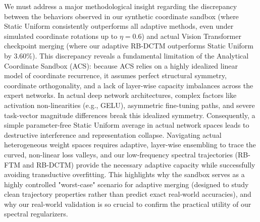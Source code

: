 We must address a major methodological insight regarding the discrepancy between the behaviors observed in our synthetic coordinate sandbox (where Static Uniform consistently outperforms all adaptive methods, even under simulated coordinate rotations up to $\eta = 0.6$) and actual Vision Transformer checkpoint merging (where our adaptive RB-DCTM outperforms Static Uniform by $3.60\%$). This discrepancy reveals a fundamental limitation of the Analytical Coordinate Sandbox (ACS): because ACS relies on a highly idealized linear model of coordinate recurrence, it assumes perfect structural symmetry, coordinate orthogonality, and a lack of layer-wise capacity imbalances across the expert networks. In actual deep network architectures, complex factors like activation non-linearities (e.g., GELU), asymmetric fine-tuning paths, and severe task-vector magnitude differences break this idealized symmetry. Consequently, a simple parameter-free Static Uniform average in actual network spaces leads to destructive interference and representation collapse. Navigating actual heterogeneous weight spaces requires adaptive, layer-wise ensembling to trace the curved, non-linear loss valleys, and our low-frequency spectral trajectories (RB-FTM and RB-DCTM) provide the necessary adaptive capacity while successfully avoiding transductive overfitting. This highlights why the sandbox serves as a highly controlled "worst-case" scenario for adaptive merging (designed to study clean trajectory properties rather than predict exact real-world accuracies), and why our real-world validation is so crucial to confirm the practical utility of our spectral regularizers.

